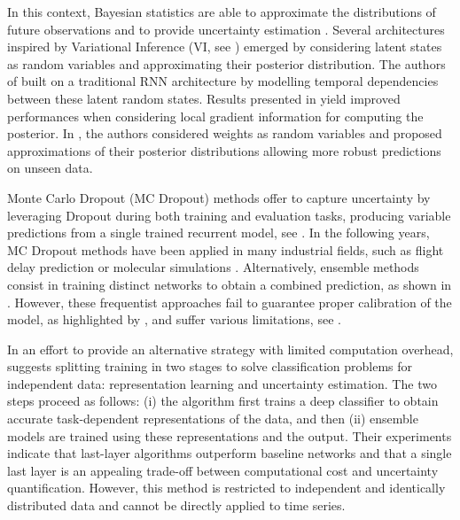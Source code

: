 \documentclass[journal]{IEEEtran}
\begin{document}
In this context, Bayesian statistics are able to approximate the distributions of future observations and to provide uncertainty estimation \cite{Hinton1995BayesianLF}.
Several architectures inspired by Variational Inference (VI, see \cite{Jordan2004AnIT}) emerged by considering latent states as random variables and approximating their posterior distribution.
The authors of \cite{Chung2015NIPS} built on a traditional RNN architecture by modelling temporal dependencies between these latent random states.
Results presented in \cite{Fortunato2017bayesian} yield improved performances when considering local gradient information for computing the posterior.
In \cite{Blundell2015}, the authors considered weights as random variables and proposed approximations of their posterior distributions allowing more robust predictions on unseen data.

Monte Carlo Dropout (MC Dropout) methods offer to capture uncertainty by leveraging Dropout during both training and evaluation tasks, producing variable predictions from a single trained recurrent model, see \cite{Gal2016NIPS}.
In the following years, MC Dropout methods have been applied in many industrial fields, such as flight delay prediction \cite{Vandal2018} or molecular simulations \cite{Wen2020UncertaintyQI}.
Alternatively, ensemble methods consist in training distinct networks to obtain a combined prediction, as shown in \cite{Pearce2018}.
However, these frequentist approaches fail to guarantee proper calibration of the model, as highlighted by \cite{ashukha2020pitfalls}, and suffer various limitations, see \cite{Fong2020}.

In an effort to provide an alternative strategy with limited computation overhead, \cite{Brosse2020OnLA} suggests splitting training in two stages to solve classification problems for independent data: representation learning and uncertainty estimation. The two steps proceed as follows: (i) the algorithm first trains a deep classifier to obtain accurate task-dependent representations of the data, and then (ii) ensemble models are trained using these representations and the output. Their experiments indicate that last-layer algorithms outperform baseline networks and that a single last layer is an appealing trade-off between computational cost and uncertainty quantification. However, this method is restricted to independent and identically distributed data and cannot be directly applied to time series.
\end{document}
